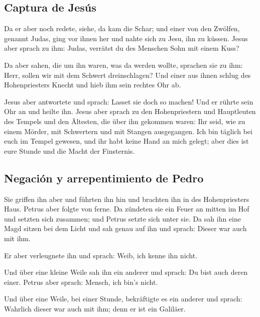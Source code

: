 \hypertarget{captura-de-jesuxfas}{%
\subsection{Captura de Jesús}\label{captura-de-jesuxfas}}

 Da er aber noch redete, siehe, da kam die Schar; und
einer von den Zwölfen, genannt Judas, ging vor ihnen her und nahte sich
zu Jesu, ihn zu küssen.  Jesus aber sprach zu ihm: Judas,
verrätst du des Menschen Sohn mit einem Kuss?

 Da aber sahen, die um ihn waren, was da werden wollte,
sprachen sie zu ihm: Herr, sollen wir mit dem Schwert dreinschlagen?
 Und einer aus ihnen schlug des Hohenpriesters Knecht und
hieb ihm sein rechtes Ohr ab.

 Jesus aber antwortete und sprach: Lasset sie doch so
machen! Und er rührte sein Ohr an und heilte ihn.  Jesus
aber sprach zu den Hohenpriestern und Hauptleuten des Tempels und den
Ältesten, die über ihn gekommen waren: Ihr seid, wie zu einem Mörder,
mit Schwertern und mit Stangen ausgegangen.  Ich bin
täglich bei euch im Tempel gewesen, und ihr habt keine Hand an mich
gelegt; aber dies ist eure Stunde und die Macht der Finsternis.

\hypertarget{negaciuxf3n-y-arrepentimiento-de-pedro}{%
\subsection{Negación y arrepentimiento de
Pedro}\label{negaciuxf3n-y-arrepentimiento-de-pedro}}

 Sie griffen ihn aber und führten ihn hin und brachten
ihn in des Hohenpriesters Haus. Petrus aber folgte von ferne.
 Da zündeten sie ein Feuer an mitten im Hof und setzten
sich zusammen; und Petrus setzte sich unter sie.  Da sah
ihn eine Magd sitzen bei dem Licht und sah genau auf ihn und sprach:
Dieser war auch mit ihm.

 Er aber verleugnete ihn und sprach: Weib, ich kenne ihn
nicht.

 Und über eine kleine Weile sah ihn ein anderer und
sprach: Du bist auch deren einer. Petrus aber sprach: Mensch, ich bin's
nicht.

 Und über eine Weile, bei einer Stunde, bekräftigte es
ein anderer und sprach: Wahrlich dieser war auch mit ihm; denn er ist
ein Galiläer.


